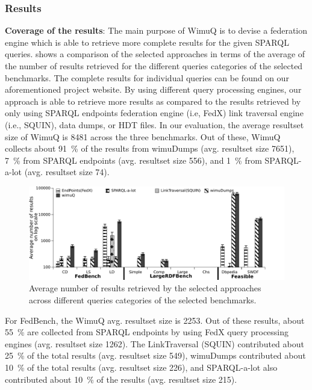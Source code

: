 \documentclass[sw]{iosart2x}
\begin{document}
\subsubsection{Results}
\textbf{Coverage of the results}: The main purpose of WimuQ is to devise a federation engine which is able to retrieve more complete results for the given SPARQL queries. %
 shows a comparison of the selected approaches in terms of the average of the number of results retrieved for the different queries categories of the selected benchmarks. The complete results for individual queries can be found on our aforementioned project website. By using different query processing engines, our approach is able to retrieve more results as compared to the results retrieved by only using SPARQL endpoints federation engine (i.e, FedX) link traversal engine (i.e., SQUIN), data dumps, or  HDT files. In our evaluation, the average resultset size of WimuQ is \num{8481} across the three benchmarks. Out of these, WimuQ collects about \SI{91}{\percent} of the results from wimuDumps (avg. resultset size 7651), \SI{7}{\percent} from SPARQL endpoints (avg. resultset size 556), and \SI{1}{\percent} from SPARQL-a-lot (avg. resultset size 74). 

\begin{figure}[htb]
    \includegraphics[width=\textwidth]{img/numberRes1.pdf}
	\caption{Average number of results retrieved by the selected approaches across different queries categories of the selected benchmarks.}
	\label{fig:numberRes1}
\end{figure}

For FedBench, the WimuQ avg. resultset size is \num{2253}. Out of these results, about \SI{55}{\percent} are collected from SPARQL endpoints by using FedX query processing engines (avg. resultset size \num{1262}). The LinkTraversal (SQUIN) contributed about \SI{25}{\percent} of the total results (avg. resultset size 549), wimuDumps contributed about \SI{10}{\percent} of the total results (avg. resultset size 226), and SPARQL-a-lot also contributed about \SI{10}{\percent} of the results (avg. resultset size 215). 
\end{document}
